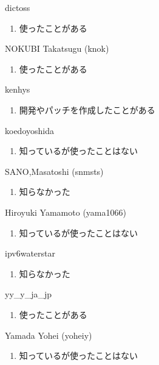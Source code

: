 \begin{prework}{ dictoss }
  \begin{enumerate}
  \item 使ったことがある
  \end{enumerate}
\end{prework}

\begin{prework}{ NOKUBI Takatsugu (knok) }
  \begin{enumerate}
  \item 使ったことがある
  \end{enumerate}
\end{prework}

\begin{prework}{ kenhys }
  \begin{enumerate}
  \item 開発やパッチを作成したことがある
  \end{enumerate}
\end{prework}

\begin{prework}{ koedoyoshida }
  \begin{enumerate}
  \item 知っているが使ったことはない
  \end{enumerate}
\end{prework}

\begin{prework}{ SANO,Masatoshi (snmsts) }
  \begin{enumerate}
  \item 知らなかった
  \end{enumerate}
\end{prework}

\begin{prework}{ Hiroyuki Yamamoto (yama1066) }
  \begin{enumerate}
  \item 知っているが使ったことはない
  \end{enumerate}
\end{prework}

\begin{prework}{ ipv6waterstar }
  \begin{enumerate}
  \item 知らなかった
  \end{enumerate}
\end{prework}

\begin{prework}{ yy\_y\_ja\_jp }
  \begin{enumerate}
  \item 使ったことがある
  \end{enumerate}
\end{prework}

\begin{prework}{ Yamada Yohei (yoheiy) }
  \begin{enumerate}
  \item 知っているが使ったことはない
  \end{enumerate}
\end{prework}
